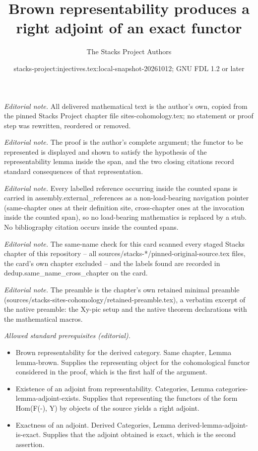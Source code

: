 \documentclass[10pt,a4paper]{amsart}
\title{Brown representability produces a right adjoint of an exact functor}
\author{The Stacks Project Authors}
\date{stacks-project:injectives.tex:local-snapshot-20261012; GNU FDL 1.2 or later}
\theoremstyle{plain}
\theoremstyle{definition}
\theoremstyle{remark}
\numberwithin{equation}{subsection}
\begin{document}
\maketitle
\noindent\textit{Editorial note.} All delivered mathematical text is the author's own, copied from the pinned Stacks Project chapter file sites-cohomology.tex; no statement or proof step was rewritten, reordered or removed.\par\medskip
\noindent\textit{Editorial note.} The proof is the author's complete argument; the functor to be represented is displayed and shown to satisfy the hypothesis of the representability lemma inside the span, and the two closing citations record standard consequences of that representation.\par\medskip
\noindent\textit{Editorial note.} Every labelled reference occurring inside the counted spans is carried in assembly.external\_references as a non-load-bearing navigation pointer (same-chapter ones at their definition site, cross-chapter ones at the invocation inside the counted span), so no load-bearing mathematics is replaced by a stub. No bibliography citation occurs inside the counted spans.\par\medskip
\noindent\textit{Editorial note.} The same-name check for this card scanned every staged Stacks chapter of this repository -- all sources/stacks-*/pinned-original-source.tex files, the card's own chapter excluded -- and the labels found are recorded in dedup.same\_name\_cross\_chapter on the card.\par\medskip
\noindent\textit{Editorial note.} The preamble is the chapter's own retained minimal preamble (sources/stacks-sites-cohomology/retained-preamble.tex), a verbatim excerpt of the native preamble: the Xy-pic setup and the native theorem declarations with the mathematical macros.\par\medskip
\noindent\textit{Allowed standard prerequisites (editorial).}\begin{itemize}
\item Brown representability for the derived category. Same chapter, Lemma lemma-brown. Supplies the representing object for the cohomological functor considered in the proof, which is the first half of the argument.
\item Existence of an adjoint from representability. Categories, Lemma categories-lemma-adjoint-exists. Supplies that representing the functors of the form Hom(F(-), Y) by objects of the source yields a right adjoint.
\item Exactness of an adjoint. Derived Categories, Lemma derived-lemma-adjoint-is-exact. Supplies that the adjoint obtained is exact, which is the second assertion.
\end{itemize}\medskip
\end{document}
